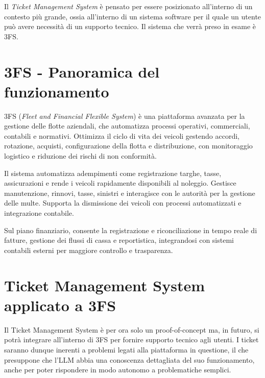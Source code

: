 \setcounter{secnumdepth}{-1}

Il \textit{Ticket Management System} è pensato per essere posizionato all'interno di un contesto più grande, ossia all'interno di un sistema software
per il quale un utente può avere necessità di un supporto tecnico. Il sistema che verrà preso in esame è 3FS{\textsuperscript{\tiny\textcopyright}}.

\section{\texorpdfstring{3FS{\textsuperscript{\tiny\textcopyright}} - Panoramica del funzionamento}{3FS (c) - Panoramica del funzionamento}}

3FS{\textsuperscript{\tiny\textcopyright}} (\textit{Fleet and Financial Flexible System}) è una piattaforma avanzata per la gestione delle flotte aziendali, 
che automatizza processi operativi, commerciali, contabili e normativi. Ottimizza il ciclo di vita dei veicoli gestendo accordi, rotazione, acquisti, configurazione 
della flotta e distribuzione, con monitoraggio logistico e riduzione dei rischi di non conformità.

Il sistema automatizza adempimenti come registrazione targhe, tasse, assicurazioni e rende i veicoli rapidamente disponibili al noleggio. Gestisce manutenzione, rinnovi, 
tasse, sinistri e interagisce con le autorità per la gestione delle multe. Supporta la dismissione dei veicoli con processi automatizzati e integrazione contabile.

Sul piano finanziario, consente la registrazione e riconciliazione in tempo reale di fatture, gestione dei flussi di cassa e reportistica, integrandosi con sistemi 
contabili esterni per maggiore controllo e trasparenza. \cite{progesoftware_3fs}

\newpage
\section{\texorpdfstring{Ticket Management System applicato a 3FS{\textsuperscript{\tiny\textcopyright}}}{Il Ticket Management System applicato a 3FS (c)}}
Il Ticket Management System è per ora solo un proof-of-concept ma, in futuro, si potrà integrare all'interno di 3FS{\textsuperscript{\tiny\textcopyright}} per fornire supporto tecnico agli utenti.
I ticket saranno dunque inerenti a problemi legati alla piattaforma in questione, il che presuppone che l'LLM abbia una conoscenza dettagliata del suo funzionamento,
anche per poter rispondere in modo autonomo a problematiche semplici.

